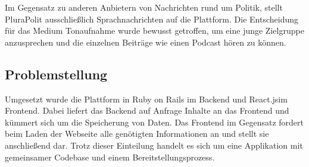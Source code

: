 Im Gegensatz zu anderen Anbietern von Nachrichten rund um Politik, stellt PluraPolit ausschließlich Sprachnachrichten auf die Plattform. Die Entscheidung für das Medium Tonaufnahme wurde bewusst getroffen, um eine junge Zielgruppe anzusprechen und die einzelnen Beiträge wie einen Podcast hören zu können.

\subsection{Problemstellung}

Umgesetzt wurde die Plattform in Ruby on Rails im Backend und React.js\footnotemark im Frontend. Dabei liefert das Backend auf Anfrage Inhalte an das Frontend und kümmert sich um die Speicherung von Daten. Das Frontend im Gegensatz fordert beim Laden der Webseite alle genötigten Informationen an und stellt sie anschließend dar. Trotz dieser Einteilung handelt es sich um eine Applikation mit gemeinsamer Codebase und einem Bereitstellungsprozess.


